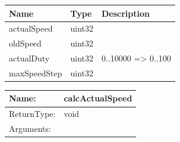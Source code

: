 \begin{par}

\end{par}


\begin{tabular}[ht]{|l|l|p{8cm}|}
\hline
\textbf{Name} & \textbf{Type} & \textbf{Description}\\
\hline
actualSpeed & uint32 & \\
\hline
oldSpeed & uint32 & \\
\hline
actualDuty & uint32 & %
0..10000 => 0..100%
\\
\hline
maxSpeedStep & uint32 & \\
\hline
\end{tabular}

\begin{tabular}[ht]{|l|l|}
\hline		
	Name: & calcActualSpeed\\
	\hline
	ReturnType: &  void\\
	\hline
	Arguments: & \\
	\hline
\end{tabular}
\newline\newline\newline
